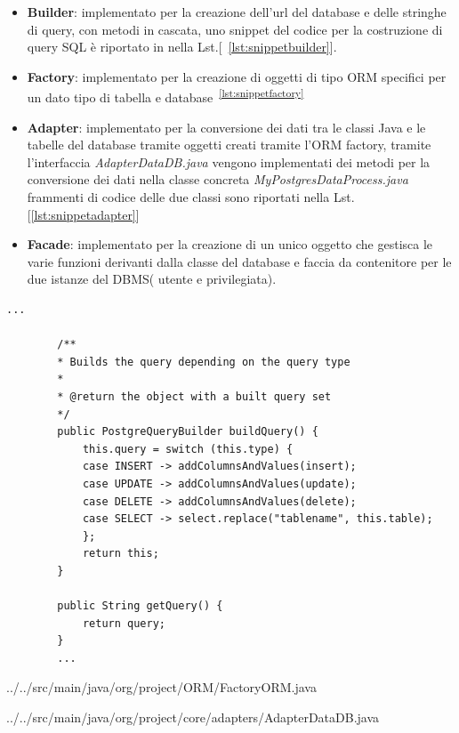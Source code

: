 \documentclass[
    10pt, %
    a4paper, %
    oneside, %
    headinclude,footinclude, %
    BCOR5mm, %
]{scrartcl}
\begin{document}
    \begin{itemize}
        \item \textbf{Builder}: implementato per la creazione dell'url del database e delle stringhe di query, con
        metodi in cascata, uno snippet del codice per la costruzione di query SQL è riportato in nella
        Lst.[~\ref{lst:snippetbuilder}].
        \item \textbf{Factory}: implementato per la creazione di oggetti di tipo ORM specifici per un dato tipo
        di tabella e database~\textsuperscript{\ref{lst:snippetfactory}}
        \item \textbf{Adapter}: implementato per la conversione dei dati tra le classi Java e le tabelle del
        database tramite oggetti creati tramite l'ORM factory, tramite l'interfaccia \textit{AdapterDataDB.java} vengono
        implementati dei metodi per la conversione dei dati nella classe concreta \textit{MyPostgresDataProcess.java}
        frammenti di codice delle due classi sono riportati nella Lst.[\ref{lst:snippetadapter}]
        \item \textbf{Facade}: implementato per la creazione di un unico oggetto che gestisca le varie funzioni
        derivanti dalla classe del database e faccia da contenitore per le due istanze del DBMS( utente e privilegiata).

    \end{itemize}

    \begin{lstlisting}[caption={Frammento di codice da PostgreQueryBuilder.java}, label={lst:snippetbuilder}]
        ...

        /**
        * Builds the query depending on the query type
        *
        * @return the object with a built query set
        */
        public PostgreQueryBuilder buildQuery() {
            this.query = switch (this.type) {
            case INSERT -> addColumnsAndValues(insert);
            case UPDATE -> addColumnsAndValues(update);
            case DELETE -> addColumnsAndValues(delete);
            case SELECT -> select.replace("tablename", this.table);
            };
            return this;
        }

        public String getQuery() {
            return query;
        }
        ...
    \end{lstlisting}
    \newpage
    
    {../../src/main/java/org/project/ORM/FactoryORM.java}
    
    {../../src/main/java/org/project/core/adapters/AdapterDataDB.java}
\end{document}
